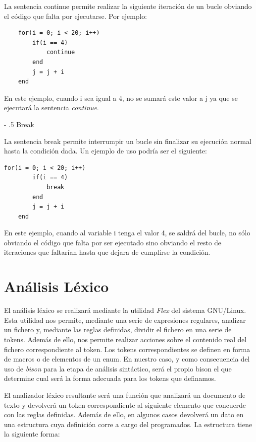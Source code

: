 \documentclass[a4paper,10pt]{article}
\makeatletter
\renewcommand\paragraph{%
   \@startsection{paragraph}{4}{0mm}%
      {-\baselineskip}%
      {.5\baselineskip}%
      {\normalfont\normalsize\bfseries}}
\makeatother
\begin{document}
La sentencia continue permite realizar la siguiente iteración de un bucle obviando el código que falta por ejecutarse. Por ejemplo:

\begin{lstlisting}
	for(i = 0; i < 20; i++)
		if(i == 4)
			continue
		end
		j = j + i
	end
\end{lstlisting}

\noindent En este ejemplo, cuando i sea igual a 4, no se sumará este valor a j ya que se ejecutará la sentencia \textit{continue}.

\paragraph{Break}

La sentencia break permite interrumpir un bucle sin finalizar su ejecución normal hasta la condición dada. Un ejemplo de uso podría ser el siguiente:

\begin{lstlisting}[language=jam]
	for(i = 0; i < 20; i++)
		if(i == 4)
			break
		end
		j = j + i
	end
\end{lstlisting}

En este ejemplo, cuando al variable i tenga el valor 4, se saldrá del bucle, no sólo obviando el código que falta por ser ejecutado sino obviando el resto de iteraciones que faltarían hasta que dejara de cumplirse la condición.

\section{Análisis Léxico}
El análisis léxico se realizará mediante la utilidad \textit{Flex}\cite{Flex} del sistema GNU/Linux. Esta utilidad nos permite, mediante una serie de expresiones regulares, analizar un fichero y, mediante las reglas definidas, dividir el fichero en una serie de tokens. Además de ello, nos permite realizar acciones sobre el contenido real del fichero correspondiente al token. Los tokens correspondientes se definen en forma de macros o de elementos de un enum. En nuestro caso, y como consecuencia del uso de \textit{bison} para la etapa de análisis sintáctico, será el propio bison el que determine cual será la forma adecuada para los tokens que definamos.

El analizador léxico resultante será una función que analizará un documento de texto y devolverá un token correspondiente al siguiente elemento que concuerde con las reglas definidas. Además de ello, en algunos casos devolverá un dato en una estructura cuya definición corre a cargo del programados. La estructura tiene la siguiente forma:
\end{document}
